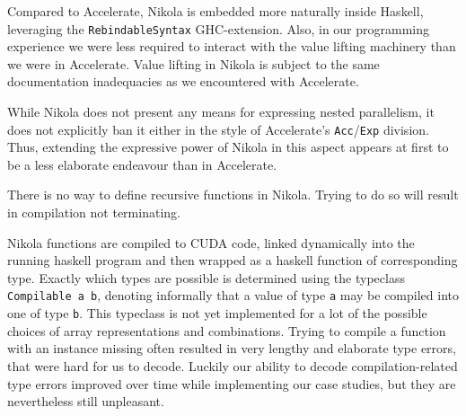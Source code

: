 Compared to Accelerate, Nikola is embedded more naturally inside Haskell,
leveraging the \texttt{RebindableSyntax} GHC-extension. Also, in our programming
experience we were less required to interact with the value lifting machinery
than we were in Accelerate. Value lifting in Nikola is subject to the same
documentation inadequacies as we encountered with Accelerate.

While Nikola does not present any means for expressing nested parallelism, it
does not explicitly ban it either in the style of Accelerate's
\texttt{Acc}/\texttt{Exp} division. Thus, extending the expressive power of
Nikola in this aspect appears at first to be a less elaborate endeavour than in
Accelerate.

There is no way to define recursive functions in Nikola. Trying to do so
will result in compilation not terminating.

Nikola functions are compiled to CUDA code, linked dynamically into the running
haskell program and then wrapped as a haskell function of corresponding type.
Exactly which types are possible is determined using the typeclass
\texttt{Compilable a b}, denoting informally that a value of type \texttt{a}
may be compiled into one of type \texttt{b}. This typeclass is not yet
implemented for a lot of the possible choices of array representations and
combinations. Trying to compile a function with an instance missing often
resulted in very lengthy and elaborate type errors, that were hard for us to
decode. Luckily our ability to decode compilation-related type errors improved
over time while implementing our case studies, but they are nevertheless still
unpleasant.

